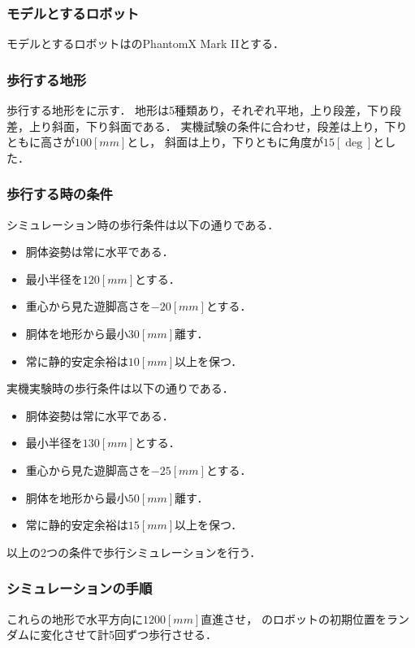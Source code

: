 \subsubsection{モデルとするロボット}
モデルとするロボットはのPhantomX Mark I\hspace{-1.2pt}Iとする．

\subsubsection{歩行する地形}
歩行する地形をに示す．
地形は5種類あり，それぞれ平地，上り段差，下り段差，上り斜面，下り斜面である．
実機試験の条件に合わせ，段差は上り，下りともに高さが$100 [mm]$とし，
斜面は上り，下りともに角度が$15 [\deg]$とした．

\subsubsection{歩行する時の条件}
シミュレーション時の歩行条件は以下の通りである．
\begin{itemize}
  \item 胴体姿勢は常に水平である．
  \item 最小半径を$120 [mm]$とする．
  \item 重心から見た遊脚高さを$-20 [mm]$とする．
  \item 胴体を地形から最小$30 [mm]$離す．
  \item 常に静的安定余裕は$10 [mm]$以上を保つ．
\end{itemize}

実機実験時の歩行条件は以下の通りである．
\begin{itemize}
  \item 胴体姿勢は常に水平である．
  \item 最小半径を$130 [mm]$とする．
  \item 重心から見た遊脚高さを$-25 [mm]$とする．
  \item 胴体を地形から最小$50 [mm]$離す．
  \item 常に静的安定余裕は$15 [mm]$以上を保つ．
\end{itemize}

以上の2つの条件で歩行シミュレーションを行う．

\subsubsection{シミュレーションの手順}
これらの地形で水平方向に$1200 [mm]$直進させ，
のロボットの初期位置をランダムに変化させて計5回ずつ歩行させる．

